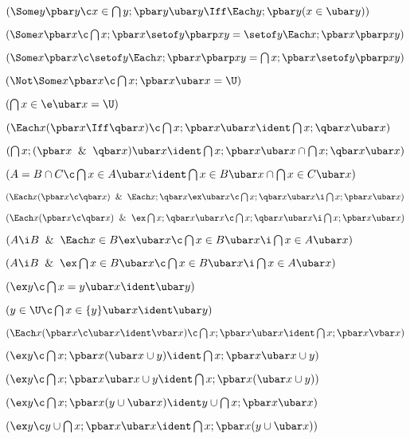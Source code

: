  $(\Some y \pbar y 
	\c x \in \bigcap y;\pbar y \ubar y \Iff \Each y;\pbar y (x \in \ubar y))$

 $(\Some x \pbar x 
	\c \bigcap x;\pbar x \setof y \pbarp xy = \setof y \Each x;\pbar x \pbarp xy)$

 $(\Some x \pbar x 
	\c \setof y \Each x;\pbar x \pbarp xy = \bigcap x;\pbar x \setof y \pbarp xy)$

 $(\Not \Some x \pbar x \c \bigcap x;\pbar x \ubar x = \U)$

 $(\bigcap x \in \e \ubar x = \U)$

 $(\Each x(\pbar x \Iff \qbar x) \c 
	\bigcap x;\pbar x \ubar x \ident \bigcap x;\qbar x \ubar x)$


 $(\bigcap x;(\pbar x \And \qbar x) \ubar x 
	\ident \bigcap x;\pbar x \ubar x \cap \bigcap x;\qbar x \ubar x)$

 $(A = B \cap C \c
\bigcap x \in A \ubar x \ident \bigcap x \in B \ubar x\cap\bigcap x \in C \ubar x)$

 $(\Each x(\pbar x \c \qbar x)  \And \Each x;\qbar x \ex \ubar x 
	\c \bigcap x;\qbar x \ubar x \i \bigcap x;\pbar x \ubar x)$

 $(\Each x(\pbar x \c \qbar x)  \And \ex \bigcap x;\qbar x \ubar x 
	\c \bigcap x;\qbar x \ubar x \i \bigcap x;\pbar x \ubar x)$


 $(A \i B  \And \Each x \in B \ex \ubar x 
	\c \bigcap x \in B \ubar x \i \bigcap x \in A \ubar x)$

 $(A \i B  \And \ex \bigcap x \in B \ubar x 
	\c \bigcap x \in B \ubar x \i \bigcap x \in A \ubar x)$

 $(\ex y \c \bigcap x = y \ubar x \ident \ubar y)$

 $(y \in \U \c \bigcap x \in \{y\} \ubar x \ident \ubar y)$

 $(\Each x (\pbar x \c \ubar x \ident \vbar x)
	\c \bigcap x ; \pbar x \ubar x \ident \bigcap x;\pbar x \vbar x)$

 $(\ex y \c \bigcap x;\pbar x(\ubar x \cup y)
	\ident \bigcap x;\pbar x\ubar x \cup y)$

 $(\ex y \c \bigcap x;\pbar x\ubar x \cup y
	\ident \bigcap x;\pbar x(\ubar x \cup y))$

 $(\ex y \c \bigcap x;\pbar x(y \cup \ubar x)
	\ident y \cup \bigcap x;\pbar x \ubar x)$

 $(\ex y \c y \cup \bigcap x;\pbar x\ubar x 
	\ident \bigcap x;\pbar x(y \cup \ubar x))$


